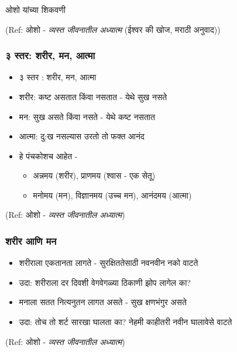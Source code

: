 \begin{frame}[fragile]\frametitle{}
\begin{center}
{\Large ओशो यांच्या शिकवणी}
\end{center}

{\tiny (Ref: ओशो - \textit{व्यस्त जीवनातील अध्यात्म} (ईश्वर की खोज, मराठी अनुवाद))}

\end{frame}

\begin{frame}[fragile]\frametitle{३ स्तर: शरीर, मन, आत्मा}

	\begin{itemize}
	\item ३ स्तर : शरीर, मन, आत्मा
	\item शरीर: कष्ट असतात किंवा नसतात - येथे सुख नसते
	\item मन: सुख असते किंवा नसते - येथे कष्ट नसतात
	\item आत्मा: दु:ख नसल्यास उरतो तो फक्त आनंद
	\item हे पंचकोशच आहेत - 
		\begin{itemize}
		\item अन्नमय (शरीर), प्राणमय (श्वास - एक सेतू)
		\item मनोमय (मन), विज्ञानमय (उच्च मन), आनंदमय (आत्मा)
		\end{itemize}
	\end{itemize}

{\tiny (Ref: ओशो - \textit{व्यस्त जीवनातील अध्यात्म})}

\end{frame}

\begin{frame}[fragile]\frametitle{शरीर आणि मन}

	\begin{itemize}
	\item शरीराला एकतानता लागते - सुरक्षिततेसाठी नवनवीन नको वाटते
	\item उदा: शरीराला दर दिवशी वेगवेगळ्या ठिकाणी झोप लागेल का?
	\item मनाला सतत नित्यनुतन लागत असते - सुख क्षणभंगुर असते
	\item उदा: तोच तो शर्ट सारखा घालता का? नेहमी काहीतरी नवीन घालावेसे वाटते
	\end{itemize}

{\tiny (Ref: ओशो - \textit{व्यस्त जीवनातील अध्यात्म})}

\end{frame}

